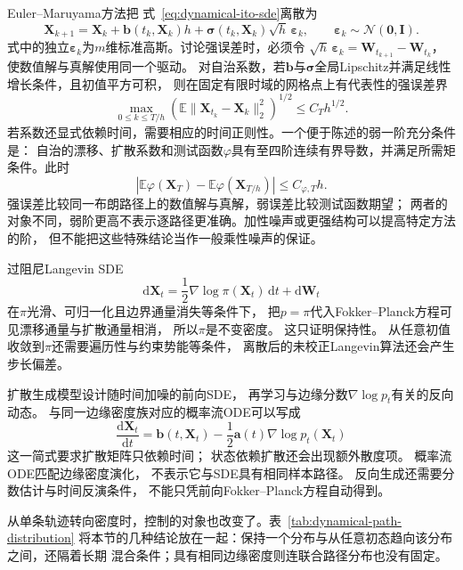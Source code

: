 Euler--Maruyama方法把 式~\eqref{eq:dynamical-ito-sde}离散为
\begin{equation}
	\bm{X}_{k+1}= \bm{X}_{k}+ \bm{b}(t_{k},\bm{X}_{k})h+ \bm{\sigma}(t_{k},\bm{X}_{k}
	)\sqrt{h}\,\bm{\varepsilon}_{k}, \qquad \bm{\varepsilon}_{k}\sim\mathcal{N}(\bm
	{0},\bm{I}). \label{eq:dynamical-euler-maruyama}
\end{equation}
式中的独立$\bm\varepsilon_k$为$m$维标准高斯。讨论强误差时，必须令
$\sqrt h\,\bm\varepsilon_k=\bm W_{t_{k+1}}-\bm W_{t_k}$，使数值解与真解使用同一个驱动。
对自治系数，若$\bm{b}$与$\bm{\sigma}$全局Lipschitz并满足线性增长条件，且初值平方可积，
则在固定有限时域的网格点上有代表性的强误差界
\[
	\max_{0\leq k\leq T/h}
	\left(\mathbb{E}\lVert\bm{X}_{t_k}-\bm{X}_k\rVert_2^2\right)^{1/2}
	\leq C_T h^{1/2}.
\]
若系数还显式依赖时间，需要相应的时间正则性。一个便于陈述的弱一阶充分条件是：
自治的漂移、扩散系数和测试函数$\varphi$具有至四阶连续有界导数，并满足所需矩条件。此时
\[
	\left|\mathbb{E}\varphi(\bm{X}_T)-\mathbb{E}\varphi(\bm{X}_{T/h})\right|
	\leq C_{\varphi,T}h.
\]
强误差比较同一布朗路径上的数值解与真解，弱误差比较测试函数期望；
两者的对象不同，弱阶更高不表示逐路径更准确。加性噪声或更强结构可以提高特定方法的阶，
但不能把这些特殊结论当作一般乘性噪声的保证。

过阻尼Langevin SDE
\begin{equation}
	\mathrm{d}\bm{X}_{t}= \frac{1}{2}\nabla\log\pi(\bm{X}_{t})\,\mathrm{d}t+ \mathrm{d}
	\bm{W}_{t}\label{eq:dynamical-langevin-sde}
\end{equation}
在$\pi$光滑、可归一化且边界通量消失等条件下， 把$p=\pi$代入Fokker--Planck方程可见漂移通量与扩散通量相消，
所以$\pi$是不变密度。 这只证明保持性。 从任意初值收敛到$\pi$还需要遍历性与约束势能等条件，
离散后的未校正Langevin算法还会产生步长偏差。

扩散生成模型设计随时间加噪的前向SDE， 再学习与边缘分数$\nabla\log p_{t}$有关的反向动态。
与同一边缘密度族对应的概率流ODE可以写成
\[
	\frac{\mathrm{d}\bm{X}_{t}}{\mathrm{d}t}= \bm{b}(t,\bm{X}_{t}) - \frac{1}{2}\bm
	{a}(t) \nabla\log p_{t}(\bm{X}_{t})
\]
这一简式要求扩散矩阵只依赖时间； 状态依赖扩散还会出现额外散度项。
概率流ODE匹配边缘密度演化， 不表示它与SDE具有相同样本路径。
反向生成还需要分数估计与时间反演条件， 不能只凭前向Fokker--Planck方程自动得到。

从单条轨迹转向密度时，控制的对象也改变了。表~\ref{tab:dynamical-path-distribution}
将本节的几种结论放在一起：保持一个分布与从任意初态趋向该分布之间，还隔着长期
混合条件；具有相同边缘密度则连联合路径分布也没有固定。

